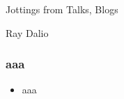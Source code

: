 \begin{frame}[fragile]\frametitle{}
\begin{center}
{\Large Jottings from Talks, Blogs}

{\small Ray Dalio}


\end{center}
\end{frame}


\begin{frame}[fragile]\frametitle{aaa}

	\begin{itemize}
	\item aaa
	\end{itemize}

\end{frame}
